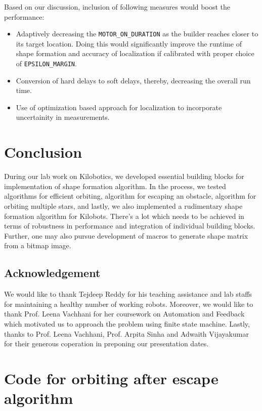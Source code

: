 \documentclass{report}[12pt]
\begin{document}
Based on our discussion, inclusion of following measures would boost the performance:
\begin{itemize}
    \item Adaptively decreasing the \texttt{MOTOR\_ON\_DURATION} as the builder reaches closer to its target location. Doing this would significantly improve the runtime of shape formation and accuracy of localization if calibrated with proper choice of \texttt{EPSILON\_MARGIN}.
    \item Conversion of hard delays to soft delays, thereby, decreasing the overall run time.
    \item Use of optimization based approach for localization to incorporate uncertainity in measurements.
\end{itemize}

\chapter{Conclusion}
During our lab work on Kilobotics, we developed essential building blocks for implementation of shape formation algorithm. In the process, we tested algorithms for efficient orbiting, algorithm for escaping an obstacle, algorithm for orbiting multiple stars, and lastly, we also implemented a rudimentary shape formation algorithm for Kilobots. There's a lot which needs to be achieved in terms of robustness in performance and integration of individual building blocks. Further, one may also pursue development of macros to generate shape matrix from a bitmap image.
\section{Acknowledgement}
We would like to thank Tejdeep Reddy for his teaching assistance and lab staffs for maintaining a healthy number of working robots. Moreover, we would like to thank Prof. Leena Vachhani for her coursework on Automation and Feedback which motivated us to approach the problem using finite state machine. Lastly, thanks to Prof. Leena Vachhani, Prof. Arpita Sinha and Adwaith Vijayakumar for their generous coperation in preponing our presentation dates. 
\appendix
\chapter{Code for orbiting after escape algorithm}
\label{c_orbit}
\end{document}
